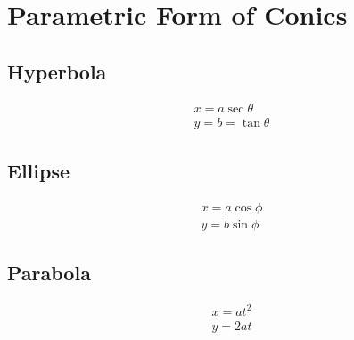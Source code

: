 \section{Parametric Form of Conics}
\subsection{Hyperbola}
\begin{align}
	x=a\sec \theta\\
	y=b=\tan \theta
\end{align}

\subsection{Ellipse}
\begin{align}
	x=a\cos\phi\\
	y=b\sin\phi
\end{align}

\subsection{Parabola}
\begin{align}
	x=at^2\\
	y=2at
\end{align}
